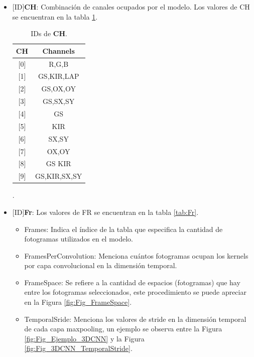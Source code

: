 \begin{onehalfspacing}
\begin{itemize}
    \item {[ID]\textbf{CH}}: Combinación de canales ocupados por el modelo. Los valores de CH se encuentran en la tabla \ref{tab:CH}.
    \begin{table}[h!]
    \centering
    \begin{tabular}{|c|c|}
        \hline 
        [ID]CH & Channels\tabularnewline
        \hline 
        \hline 
        {[}0{]} & R,G,B\tabularnewline
        \hline 
        {[}1{]} & GS,KIR,LAP\tabularnewline
        \hline 
        {[}2{]} & GS,OX,OY\tabularnewline
        \hline 
        {[}3{]} & GS,SX,SY\tabularnewline
        \hline 
        {[}4{]} & GS\tabularnewline
        \hline 
        {[}5{]} & KIR\tabularnewline
        \hline 
        {[}6{]} & SX,SY\tabularnewline
        \hline 
        {[}7{]} & OX,OY\tabularnewline
        \hline 
        {[}8{]} & GS KIR\tabularnewline
        \hline 
        {[}9{]} & GS,KIR,SX,SY\tabularnewline
        \hline 
    \end{tabular}%
    \caption{\footnotesize IDs de \textbf{CH}.}.
    \label{tab:CH}
    \end{table} 
    \item {[ID]\textbf{Fr}}: Los valores de FR se encuentran en la tabla \ref{tab:Fr}.
    \begin{itemize}
        \item Frames: Indica el índice de la tabla que especifica la cantidad de fotogramas utilizados en el modelo.
        \item FramesPerConvolution: Menciona cuántos fotogramas ocupan los kernels por capa convolucional en la dimensión temporal. 
        \item FrameSpace: Se refiere a la cantidad de espacios (fotogramas) que hay entre los fotogramas seleccionados, este procedimiento se puede apreciar en la Figura \ref{fig:Fig_FrameSpace}.
        \item TemporalSride: Menciona los valores de stride en la dimensión temporal de cada capa maxpooling, un ejemplo se observa entre la Figura \ref{fig:Fig_Ejemplo_3DCNN} y  la Figura \ref{fig:Fig_3DCNN_TemporalStride}.
    \end{itemize}
    

\end{itemize}
\end{onehalfspacing}
